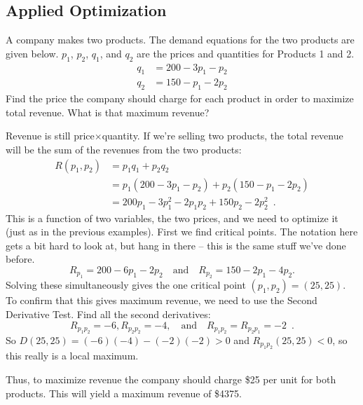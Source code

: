 \subsection{Applied Optimization}
\begin{example}
A company makes two products. The demand equations for the two products are given below. $p_1$, $p_2$, $q_1$, and $q_2$ are the prices and quantities for Products 1 and 2.
\begin{align*}
  q_1 &= 200 - 3p_1 - p_2 \\
  q_2 &= 150 - p_1 - 2p_2
\end{align*}
Find the price the company should charge for each product in order to maximize total revenue. What is that maximum revenue?

\begin{solution}
Revenue is still price$\times$quantity. If we're selling two products, the total revenue will be the sum of the revenues from the two products:
\begin{align*}
R(p_1,p_2) &= p_1q_1 + p_2q_2 \\
  &= p_1(200 - 3p_1 - p_2) + p_2(150 - p_1 - 2p_2) \\
  &= 200p_1 - 3p_1^2 - 2p_1p_2 + 150p_2 - 2p_2^2 \enspace .
\end{align*}
This is a function of two variables, the two prices, and we need to optimize it (just as in the previous examples). First we find critical points. The notation here gets a bit hard to look at, but hang in there – this is the same stuff we've done before.
$$R_{p_1} = 200-6p_1-2p_2  \quad \text{and}\quad  R_{p_2}=150-2p_1-4p_2.$$
Solving these simultaneously gives the one critical point $(p_1,p_2)=(25,25)$.
To confirm that this gives maximum revenue, we need to use the Second Derivative Test. Find all the second derivatives:
$$R_{p_1p_2} = -6, R_{p_2p_2} = -4, \quad \text{and}\quad  R_{p_1p_2} = R_{p_2p_1} = -2 \enspace .$$
So $D(25, 25) = (-6)(-4)-(-2)(-2)>0$ and $R_{p_1p_2}(25,25) < 0$, so this really is a local maximum.

Thus, to maximize revenue the company should charge \$25 per unit for both products. This will yield a maximum revenue of \$4375.
\end{solution}\end{example}
